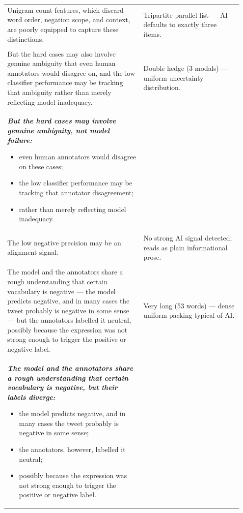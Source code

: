 \documentclass[11pt]{article}
\begin{document}
\begin{longtable}{|p{0.55\linewidth}|p{0.40\linewidth}|}
\hline
\rule{0pt}{3.5cm} & \\
\hline
Unigram count features, which discard word order, negation scope, and context, are poorly equipped to capture these distinctions. & Tripartite parallel list --- AI defaults to exactly three items. \\[2pt]
\hline
\rule{0pt}{3.5cm} & \\
\hline
But the hard cases may also involve genuine ambiguity that even human annotators would disagree on, and the low classifier performance may be tracking that ambiguity rather than merely reflecting model inadequacy. & Double hedge (3 modals) --- uniform uncertainty distribution. \\[2pt]
\hline
{\bfseries\itshape But the hard cases may involve genuine ambiguity, not model failure:
\begin{itemize}[leftmargin=*,topsep=2pt,itemsep=1pt,parsep=0pt]
  \item even human annotators would disagree on these cases;
  \item the low classifier performance may be tracking that annotator disagreement;
  \item rather than merely reflecting model inadequacy.
\end{itemize}}\vspace{2em} & \\
\hline
The low negative precision may be an alignment signal. & No strong AI signal detected; reads as plain informational prose. \\[2pt]
\hline
\rule{0pt}{3.5cm} & \\
\hline
The model and the annotators share a rough understanding that certain vocabulary is negative --- the model predicts negative, and in many cases the tweet probably is negative in some sense --- but the annotators labelled it neutral, possibly because the expression was not strong enough to trigger the positive or negative label. & Very long (53 words) --- dense uniform packing typical of AI. \\[2pt]
\hline
{\bfseries\itshape The model and the annotators share a rough understanding that certain vocabulary is negative, but their labels diverge:
\begin{itemize}[leftmargin=*,topsep=2pt,itemsep=1pt,parsep=0pt]
  \item the model predicts negative, and in many cases the tweet probably is negative in some sense;
  \item the annotators, however, labelled it neutral;
  \item possibly because the expression was not strong enough to trigger the positive or negative label.

\end{itemize}}
\end{longtable}
\end{document}
